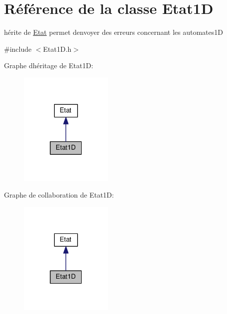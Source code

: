 \hypertarget{class_etat1_d}{}\section{Référence de la classe Etat1D}
\label{class_etat1_d}


hérite de \hyperlink{class_etat}{Etat} permet d\textquotesingle{}envoyer des erreurs concernant les automates1D  




{\ttfamily \#include $<$Etat1\+D.\+h$>$}



Graphe d\textquotesingle{}héritage de Etat1D\+:\nopagebreak
\begin{figure}[H]
\begin{center}
\leavevmode
\includegraphics[width=127pt]{class_etat1_d__inherit__graph}
\end{center}
\end{figure}


Graphe de collaboration de Etat1D\+:\nopagebreak
\begin{figure}[H]
\begin{center}
\leavevmode
\includegraphics[width=127pt]{class_etat1_d__coll__graph}
\end{center}
\end{figure}
